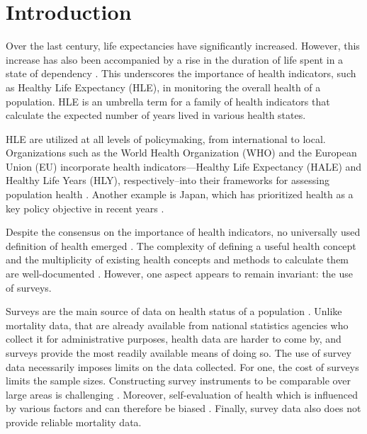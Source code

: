 \documentclass[risks,article,submit,moreauthors,pdftex]{Definitions/mdpi}
\begin{document}

\newcommand{\revM}[1]{{\color{red} #1}}

\hypertarget{introduction}{%
\section{Introduction}\label{introduction}}

Over the last century, life expectancies have significantly increased.
However, this increase has also been accompanied by a rise in the
duration of life spent in a state of dependency
\citep{fries_aging_1980, gruenberg_failures_2005}. This underscores the
importance of health indicators, such as Healthy Life Expectancy (HLE),
in monitoring the overall health of a population. HLE is an umbrella
term for a family of health indicators that calculate the expected
number of years lived in various health states.

HLE are utilized at all levels of policymaking, from international to
local. Organizations such as the World Health Organization (WHO) and the
European Union (EU) incorporate health indicators---Healthy Life
Expectancy (HALE) and Healthy Life Years (HLY), respectively--into their
frameworks for assessing population health
\citep{world_health_organization_world_2023, bogaert_use_2018}. Another
example is Japan, which has prioritized health as a key policy objective
in recent years \citep{abe_japans_2013}.

Despite the consensus on the importance of health indicators, no
universally used definition of health emerged
\cite[Chapter~1]{jagger_international_2020}. The complexity of defining
a useful health concept and the multiplicity of existing health concepts
and methods to calculate them are well-documented
\citep{kim_review_2022}. However, one aspect appears to remain
invariant: the use of surveys.

Surveys are the main source of data on health status of a population
\cite[Chapter~5]{jagger_international_2020}. Unlike mortality data, that
are already available from national statistics agencies who collect it
for administrative purposes, health data are harder to come by, and
surveys provide the most readily available means of doing so. The use of
survey data necessarily imposes limits on the data collected. For one,
the cost of surveys limits the sample sizes. Constructing survey
instruments to be comparable over large areas is challenging
\citep{robine_creating_2003}. Moreover, self-evaluation of health which
is influenced by various factors and can therefore be biased
\citep{kempen_assessment_1996, krause_what_1994, peersman_gender_2012}.
Finally, survey data also does not provide reliable mortality data.
\end{document}
